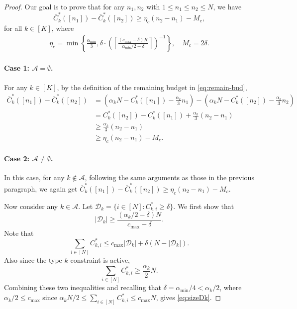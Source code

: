 \documentclass{article}
\theoremstyle{plain}
\theoremstyle{remark}
\newcommand{\abs}[1]{\left\lvert#1\right\rvert}
\newcommand{\rembud}{\overline{C}^*} %
\newcommand{\costIDreassign}{\delta} %
\newcommand{\cA}{\mathcal{A}}
\newcommand{\cD}{\mathcal{D}}
\newcommand{\sets}[1]{\left\{ #1 \right\}}
\begin{document}
\begin{proof}
Our goal is to prove that for any $n_1,n_2$ with $1\le n_1\le n_2\le N$, we have
\begin{equation}
    \rembud_k([n_1])-\rembud_k([n_2])\ge \eta_c(n_2-n_1)-M_c,
\end{equation}
for all $k\in[K]$, where
\begin{align*}
    \eta_c = \min\sets{\frac{\alpha_{\min}}{3},\costIDreassign\cdot\left(\left\lceil \frac{(c_{\max}-\costIDreassign)K}{\alpha_{\min}/2-\costIDreassign}\right\rceil\right)^{-1}}, \quad M_c = 2\costIDreassign.
\end{align*}


\paragraph{Case 1: $\cA=\emptyset$.}
For any $k\in[K]$, by the definition of the remaining budget in \eqref{eq:remain-bud},
\begin{align*}
    \rembud_k([n_1])-\rembud_k([n_2])&=\left(\alpha_k N - C_k^*([n_1])-\frac{\alpha_k}{3}n_1\right) - \left(\alpha_k N - C_k^*([n_2])-\frac{\alpha_k}{3}n_2\right)\\
    &= C_k^*([n_2])- C_k^*([n_1]) + \frac{\alpha_k}{3}(n_2-n_1)\\
    &\ge \frac{\alpha_k}{3}(n_2-n_1)\\
    &\ge \eta_c(n_2-n_1)-M_c.
\end{align*}

\paragraph{Case 2: $\cA\neq \emptyset$.}
In this case, for any $k\notin \cA$, following the same arguments as those in the previous paragraph, we again get $\rembud_k([n_1])-\rembud_k([n_2])\ge \eta_c(n_2-n_1)-M_c.$

Now consider any $k\in\cA$.
Let $\cD_k=\{i\in[N]\colon C_{k,i}^*\ge \costIDreassign\}.$
We first show that
\begin{equation}\label{eq:sizeDk}
\abs{\cD_k}\geq \frac{(\alpha_k/2-\costIDreassign)N}{c_{\max}-\costIDreassign}.
\end{equation}
Note that 
\begin{equation}
    \sum_{i\in [N]} C_{k,i}^* \leq c_{\max}|\cD_k|+\costIDreassign (N-|\cD_k|).
\end{equation}
Also since the type-$k$ constraint is active,
\begin{equation}
    \sum_{i\in[N]} C_{k,i}^* \ge \frac{\alpha_k}{2}N.
\end{equation}
Combining these two inequalities and recalling that $\costIDreassign = \alpha_{\min}/4 < \alpha_k/2$, where $\alpha_k/2 \le c_{\max}$ since $\alpha_kN/2\le \sum_{i\in[N]} C_{k,i}^*\le c_{\max}N$,
gives \eqref{eq:sizeDk}.


\end{proof}
\end{document}
